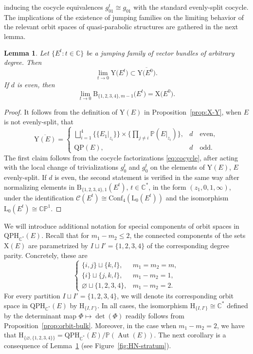 \documentclass[pdftex]{sigma}
\newcommand{\field}[1]{\ensuremath{\mathbb{#1}}}
\newcommand{\CC}{\field{C}}
\newcommand{\PP}{\field{P}}
\newcommand{\curly}[1]{\mathscr{#1}}
\newcommand{\cC}{\curly{C}}
\DeclareMathOperator{\Aut}{Aut}
\numberwithin{equation}{section}
\newtheorem{Lemma}[Theorem]{Lemma}
\begin{document}
 inducing the cocycle equivalences $g^{t}_{01}\cong g_{01}$ with the standard evenly-split cocycle. The implications of the existence of jumping families on the limiting behavior of the relevant orbit spaces of quasi-parabolic structures are gathered in the next lemma.

\begin{Lemma}\label{lemma:limit}
Let $\{E^{t}\colon t\in\CC\}$ be a jumping family of vector bundles of arbitrary degree. Then
\[
\lim\limits_{t\rightarrow 0} \mathrm{Y}\big(E^{t}\big) \subset \overline{\mathrm{Y}\big(E^{0}\big)}.
\]
If $d$ is even, then
\[
\lim\limits_{t\rightarrow 0} \mathrm{B}_{\{1,2,3,4\},m-1}\big(E^{t}\big) = \mathrm{X}\big(E^{0}\big).
\]
\end{Lemma}

\begin{proof}
It follows from the definition of $\mathrm{Y}(E)$ in Proposition~\ref{prop:X-Y}, when $E$ is not evenly-split, that
\[
\overline{\mathrm{Y}(E)} =
 \begin{cases}
\displaystyle\bigsqcup_{i=1}^{4} \{\{E_{1}\vert_{z_{i}}\} \} \times \bigg\{\prod_{j\neq i}\PP(E\vert_{z_{i}}) \bigg\},& d\quad \text{even},\\
\displaystyle\mathrm{QP}(E), & d\quad \text{odd}.
\end{cases}
\]
The first claim follows from the cocycle factorizations \eqref{eq:cocycle}, after acting with the local change of trivializations $g^{t}_{0}$ and $g^{t}_{0}$ on the elements of $\mathrm{Y}(E)$, $E$ evenly-split. If $d$ is even, the second statement is verified in the same way after normalizing elements in $\mathrm{B}_{\{1,2,3,4\},1}(E^{t})$, $t\in\CC^{*}$, in the form $(z_{1},0,1,\infty)$, under the identification $\cC(E^{t})\cong \mathrm{Conf}_{4}(\mathrm{L}_{0}(E^{t}))$ and the isomorphism $\mathrm{L}_{0}(E^{t})\cong\CC\PP^{1}$.
\end{proof}

We will introduce additional notation for special components of orbit spaces in $\mathrm{QPH}_{\CC^{*}}(E)$. Recall that for $m_{1}-m_{2}\leq 2$, the connected components of the sets $\mathrm{X}(E)$ are parametrized by $I\sqcup I' = \{1,2,3,4\}$ of the corresponding degree parity. Concretely, these are
\[
 \begin{cases}
\{i,j\}\sqcup \{k,l\},& m_{1} = m_{2} = m,\\
\{i\}\sqcup\{j,k,l\}, & m_{1} - m_{2} = 1,\\
\varnothing \sqcup \{1,2,3,4\}, & m_{1} - m_{2} = 2.
\end{cases}
\]
For every partition $I\sqcup I' = \{1,2,3,4\}$, we will denote its corresponding orbit space in $\mathrm{QPH}_{\CC^{*}}(E)$ by $\mathrm{H}_{\{I,I'\}}$. In all cases, the isomorphism $\mathrm{H}_{\{I,I'\}}\cong \CC^{*}$ defined by the determinant map $\Phi\mapsto\det(\Phi)$ readily follows from Proposition~\ref{prop:orbit-bulk}. Moreover, in the case when $m_{1}-m_{2} = 2$, we have that $\mathrm{H}_{\{\varnothing ,\{1,2,3,4\}\}} = \mathrm{QPH}_{\CC^{*}}(E)/\PP(\Aut(E))$. The next corollary is a consequence of Lemma~\ref{lemma:limit} (see Figure~\ref{fig:HN-stratum}).
\end{document}
